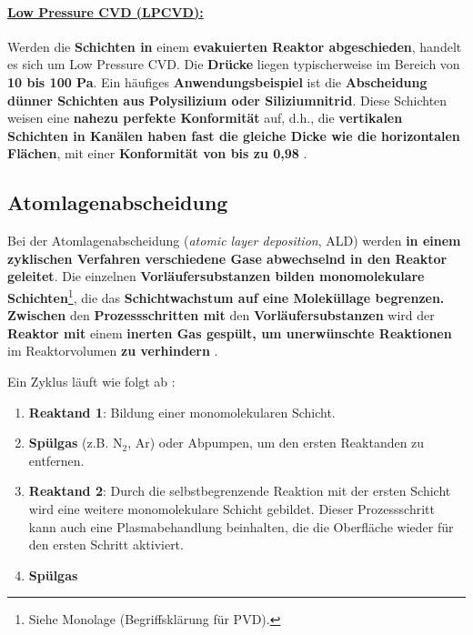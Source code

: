 \documentclass{article} %
\begin{document}
\vspace{0.0em}
\paragraph{\uline{Low Pressure CVD (LPCVD):}} Werden die \textbf{Schichten in} einem \textbf{evakuierten Reaktor abgeschieden}, handelt es sich um Low Pressure 
CVD. Die \textbf{Drücke} liegen typischerweise im Bereich von \textbf{10 bis 100 Pa}. Ein häufiges \textbf{Anwendungsbeispiel} ist die \textbf{Abscheidung dünner 
Schichten aus Polysilizium oder Siliziumnitrid}. Diese Schichten weisen eine \textbf{nahezu perfekte Konformität} auf, d.h., die \textbf{vertikalen Schichten in 
Kanälen haben fast die gleiche Dicke wie die horizontalen Flächen}, mit einer \textbf{Konformität von bis zu 0,98} \cite{keplinger2024CVD}.

\vspace{1em}
\subsection{Atomlagenabscheidung} %
Bei der Atomlagenabscheidung (\textit{atomic layer deposition}, ALD) werden \textbf{in einem zyklischen Verfahren verschiedene Gase abwechselnd in den Reaktor geleitet}. Die einzelnen \textbf{Vorläufersubstanzen bilden monomolekulare Schichten}\footnote{Siehe Monolage (Begriffsklärung für PVD).}, die das \textbf{Schichtwachstum auf eine Moleküllage begrenzen. Zwischen} den \textbf{Prozessschritten mit} den \textbf{Vorläufersubstanzen} wird der \textbf{Reaktor mit} einem \textbf{inerten Gas gespült, um unerwünschte Reaktionen} im Reaktorvolumen \textbf{zu verhindern} \cite{keplinger2024CVD}.

\vspace{1em}

Ein Zyklus läuft wie folgt ab \cite{keplinger2024CVD}:

\begin{enumerate}
    \item \textbf{Reaktand 1}: Bildung einer monomolekularen Schicht.
    \item \textbf{Spülgas} (z.B. N$_2$, Ar) oder Abpumpen, um den ersten Reaktanden zu entfernen.
    \item \textbf{Reaktand 2}: Durch die selbstbegrenzende Reaktion mit der ersten Schicht wird eine weitere monomolekulare Schicht gebildet. Dieser Prozessschritt kann auch eine Plasmabehandlung beinhalten, die die Oberfläche wieder für den ersten Schritt aktiviert.
    \item \textbf{Spülgas}
\end{enumerate}
\end{document}
